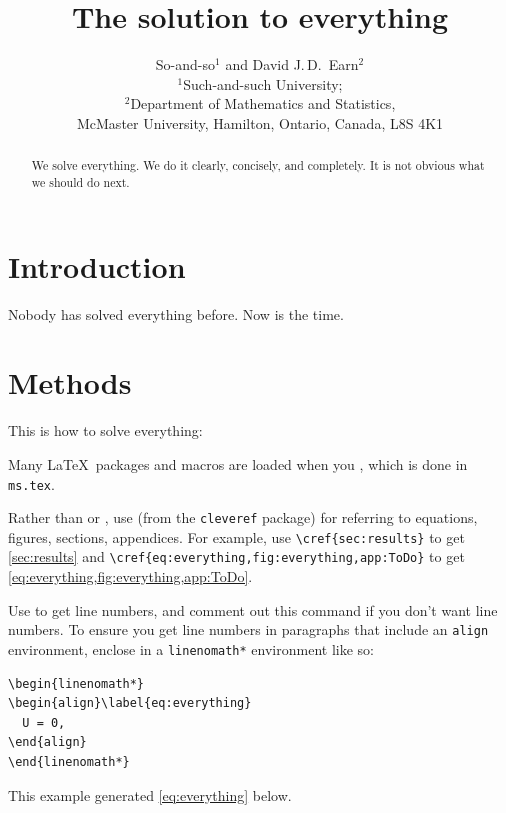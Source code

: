 \documentclass[12pt]{article}\usepackage[]{graphicx}\usepackage[]{xcolor}
\title{The solution to everything}
\author{So-and-so$^1$ and David J.\,D.\ Earn$^2$\\
  $^1$Such-and-such University;\\
  $^2$Department of Mathematics and Statistics,\\
  McMaster University, Hamilton, Ontario, Canada, L8S 4K1
  \\ 
  \medskip
  \spewmoddates
}
\begin{document}
\maketitle

\linenumbers

\begin{abstract}
  We solve everything.  We do it clearly, concisely, and completely.
  It is not obvious what we should do next.
\end{abstract}



\section{Introduction}\label{sec:intro}

Nobody has solved everything before.
Now is the time.

\section{Methods}\label{sec:methods}

This is how to solve everything:

Many \LaTeX\ packages and macros are loaded when you
\verb||, which is done in \texttt{ms.tex}.

Rather than  or , use  (from the
\texttt{cleveref} package) for referring to equations, figures,
sections, appendices.  For example, use \verb|\cref{sec:results}| to
get \cref{sec:results} and \verb|\cref{eq:everything,fig:everything,app:ToDo}|
to get \cref{eq:everything,fig:everything,app:ToDo}.

Use  to get line numbers, and comment out this
command if you don't want line numbers.  To ensure you get line numbers
in paragraphs that include an \texttt{align} environment, enclose in a
\verb|linenomath*| environment like so:
\begin{verbatim}
\begin{linenomath*}
\begin{align}\label{eq:everything}
  U = 0,
\end{align}
\end{linenomath*}
\end{verbatim}
This example generated \cref{eq:everything} below.
\end{document}
